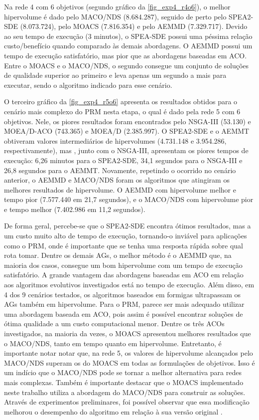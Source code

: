 Na rede 4 com 6 objetivos (segundo gráfico da \autoref{fig_exp4_r4o6}), o melhor hipervolume é dado pelo MACO/NDS (8.684.287), seguido de perto pelo SPEA2-SDE (8.073.724), pelo MOACS (7.816.354) e pelo AEMMD (7.329.717). Devido ao seu tempo de execução (3 minutos), o SPEA-SDE possui uma péssima relação custo/benefício quando comparado às demais abordagens. O AEMMD possui um tempo de execução satisfatório, mas pior que as abordagens baseadas em ACO. Entre o MOACS e o MACO/NDS, o segundo consegue um conjunto de soluções de qualidade superior ao primeiro e leva apenas um segundo a mais para executar, sendo o algoritmo indicado para esse cenário.

O terceiro gráfico da \autoref{fig_exp4_r5o6} apresenta os resultados obtidos para o cenário mais complexo do PRM nesta etapa, o qual é dado pela rede 5 com 6 objetivos. Nele, os piores resultados foram encontrados pelo NSGA-III (53.130) e MOEA/D-ACO (743.365) e MOEA/D (2.385.997). O SPEA2-SDE e o AEMMT obtiveram valores intermediários de hipervolumes (4.731.148 e 3.954.286, respectivamente), mas , junto com o NSGA-III, apresentam os piores tempos de execução: 6,26 minutos para o SPEA2-SDE, 34,1 segundos para o NSGA-III e 26,8 segundos para o AEMMT. Novamente, repetindo o ocorrido no cenário anterior, o AEMMD e MACO/NDS foram os algoritmos que atingiram os melhores resultados de hipervolume. O AEMMD com hipervolume melhor e tempo pior (7.577.440 em 21,7 segundos), e o MACO/NDS com hipervolume pior e tempo melhor (7.402.986 em 11,2 segundos).

De forma geral, percebe-se que o SPEA2-SDE encontra ótimos resultados, mas a um custo muito alto de tempo de execução, tornando-o inviável para aplicações como o PRM, onde é importante que se tenha uma resposta rápida sobre qual rota tomar. Dentre os demais AGs, o melhor método é o AEMMD que, na maioria dos casos, consegue um bom hipervolume com um tempo de execução satisfatório. A grande vantagem das abordagens baseadas em ACO em relação aos algoritmos evolutivos investigados está no tempo de execução. Além disso, em 4 dos 9 cenários testados, os algoritmos baseados em formigas ultrapassam os AGs também em hipervolume. Para o PRM, parece ser mais adequado utilizar uma abordagem baseada em ACO, pois assim é possível encontrar soluções de ótima qualidade a um custo computacional menor. Dentre os três ACOs investigados, na maioria da vezes, o MOACS apresentou melhores resultados que o MACO/NDS, tanto em tempo quanto em hipervolume. Entretanto, é importante notar notar que, na rede 5, os valores de hipervolume alcançados pelo MACO/NDS superam os do MOACS em todas as formulações de objetivos. Isso é um indício que o MACO/NDS pode se tornar a melhor alternativa para redes mais complexas. Também é importante destacar que o MOACS implementado neste trabalho utiliza a abordagem do MACO/NDS para construir as soluções. Através de experimentos preliminares, foi possível observar que essa modificação melhorou o desempenho do algoritmo em relação à sua versão original \cite{Riveros2016}.

